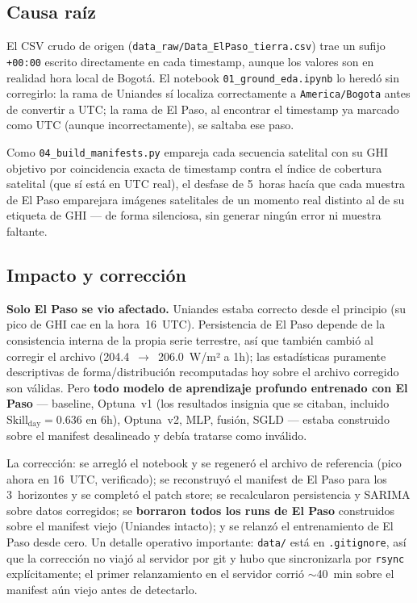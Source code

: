 \documentclass[12pt,a4paper]{article}
\begin{document}
\subsection{Causa raíz}

El CSV crudo de origen (\texttt{data\_raw/Data\_ElPaso\_tierra.csv}) trae un
sufijo \texttt{+00:00} escrito directamente en cada timestamp, aunque los
valores son en realidad hora local de Bogotá. El notebook
\texttt{01\_ground\_eda.ipynb} lo heredó sin corregirlo: la rama de Uniandes
sí localiza correctamente a \texttt{America/Bogota} antes de convertir a
UTC; la rama de El Paso, al encontrar el timestamp ya marcado como UTC
(aunque incorrectamente), se saltaba ese paso.

Como \texttt{04\_build\_manifests.py} empareja cada secuencia satelital con
su GHI objetivo por coincidencia exacta de timestamp contra el índice de
cobertura satelital (que sí está en UTC real), el desfase de 5~horas hacía
que cada muestra de El Paso emparejara imágenes satelitales de un momento
real distinto al de su etiqueta de GHI --- de forma silenciosa, sin generar
ningún error ni muestra faltante.

\subsection{Impacto y corrección}

\textbf{Solo El Paso se vio afectado.} Uniandes estaba correcto desde el
principio (su pico de GHI cae en la hora~16~UTC). Persistencia de El Paso
depende de la consistencia interna de la propia serie terrestre, así que
también cambió al corregir el archivo (204.4~$\to$~206.0~W/m² a 1h); las
estadísticas puramente descriptivas de forma/distribución recomputadas hoy
sobre el archivo corregido son válidas. Pero \textbf{todo modelo de
aprendizaje profundo entrenado con El Paso} --- baseline, Optuna~v1 (los
resultados insignia que se citaban, incluido $\text{Skill}_\text{day}=0.636$
en 6h), Optuna~v2, MLP, fusión, SGLD --- estaba construido sobre el manifest
desalineado y debía tratarse como inválido.

La corrección: se arregló el notebook y se regeneró el archivo de referencia
(pico ahora en 16~UTC, verificado); se reconstruyó el manifest de El Paso
para los 3~horizontes y se completó el patch store; se recalcularon
persistencia y SARIMA sobre datos corregidos; se \textbf{borraron todos los
runs de El Paso} construidos sobre el manifest viejo (Uniandes intacto); y se
relanzó el entrenamiento de El Paso desde cero. Un detalle operativo
importante: \texttt{data/} está en \texttt{.gitignore}, así que la corrección
no viajó al servidor por git y hubo que sincronizarla por \texttt{rsync}
explícitamente; el primer relanzamiento en el servidor corrió $\sim$40~min
sobre el manifest aún viejo antes de detectarlo.
\end{document}

